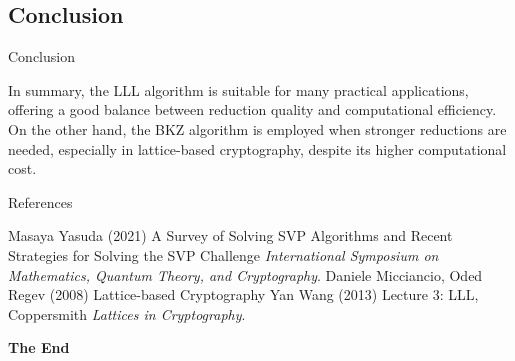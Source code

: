 \documentclass[aspectratio=169]{beamer}
\begin{document}
    \subsection{Conclusion}

    \begin{frame}{Conclusion}
        \begin{block}{}
            In summary, the LLL algorithm is suitable for many practical applications, offering a good balance between reduction quality and computational efficiency. On the other hand, the BKZ algorithm is employed when stronger reductions are needed, especially in lattice-based cryptography, despite its higher computational cost.
        \end{block} 
    \end{frame}

    \begin{frame}{References}
    
    \footnotesize{
        \begin{thebibliography}{99}
             Masaya Yasuda (2021)
            \newblock A Survey of Solving SVP Algorithms and Recent Strategies for Solving the SVP Challenge
            \newblock \emph{International Symposium on Mathematics, Quantum Theory, and Cryptography}.
             Daniele Micciancio, Oded Regev (2008)
            \newblock Lattice-based Cryptography
             Yan Wang (2013)
            \newblock Lecture 3: LLL, Coppersmith
            \newblock \emph{Lattices in Cryptography}.
        \end{thebibliography}
    }
    \end{frame}

    \begin{frame}
        \Huge{\centerline{\textbf{The End}}}
    \end{frame}
\end{document}

